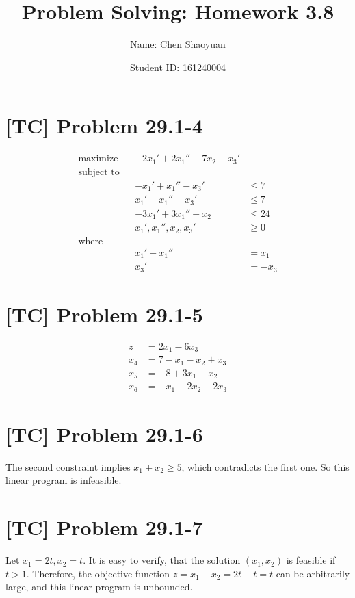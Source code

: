 \documentclass[a4paper,11pt,twocolumn]{article}
\newcommand{\homeworkno}{3.8}
\begin{document}
  \title{Problem Solving: Homework \homeworkno}
  \author{Name: Chen Shaoyuan \and Student ID: 161240004}
  \maketitle

  \section{[TC] Problem 29.1-4}
  \begin{align*}
    \text{maximize} && -2x_1'  +  2x_1''  -  7x_2  +  x_3' \\
    \text{subject to} \\
    && -x_1'  +  x_1''  -  x_3'  &\leq  7 \\
    && x_1'  -  x_1''  +  x_3'  &\leq  7 \\
    && -3x_1'  +  3x_1''  -  x_2  &\leq  24 \\
    && x_1',  x_1'',  x_2,  x_3'  &\geq  0\\
    \text{where}  \\
    && x_1' - x_1'' &= x_1\\
    && x_3' &= -x_3
  \end{align*}

  \section{[TC] Problem 29.1-5}
  \begin{align*}
    z & = 2x_1 - 6x_3 \\
    x_4 &= 7 - x_1 - x_2 + x_3 \\
    x_5 &= -8 + 3x_1 - x_2\\
    x_6 &= -x_1 + 2x_2 + 2x_3
  \end{align*}

  \section{[TC] Problem 29.1-6}
  The second constraint implies $x_1 + x_2 \geq 5$, which contradicts the first one. So this linear program is infeasible.

  \section{[TC] Problem 29.1-7}
  Let $x_1 = 2t, x_2 = t$. It is easy to verify, that the solution $(x_1, x_2)$ is feasible if $t>1$. Therefore, the objective function $z = x_1 - x_2 = 2t - t  = t$ can be arbitrarily large, and this linear program is unbounded.
\end{document}
